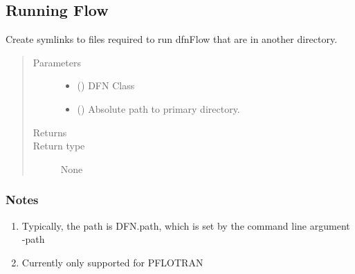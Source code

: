 \documentclass[letterpaper,10pt,english]{sphinxmanual}
\begin{document}
\subsection{Running Flow}
\label{\detokenize{pydfnworks:module-pydfnworks.dfnFlow.flow}}\label{\detokenize{pydfnworks:running-flow}}

\begin{fulllineitems}
\label{\detokenize{pydfnworks:pydfnworks.dfnFlow.flow.create_dfn_flow_links}}
Create symlinks to files required to run dfnFlow that are in another directory.
\begin{quote}\begin{description}
\item[{Parameters}] \leavevmode\begin{itemize}
\item {} 
 () \textendash{} DFN Class

\item {} 
 () \textendash{} Absolute path to primary directory.

\end{itemize}

\item[{Returns}] \leavevmode


\item[{Return type}] \leavevmode
None

\end{description}\end{quote}
\subsubsection*{Notes}
\begin{enumerate}
\def\theenumi{\arabic{enumi}}
\def\labelenumi{\theenumi .}
\makeatletter\def\p@enumii{\p@enumi \theenumi .}\makeatother
\item {} 
Typically, the path is DFN.path, which is set by the command line argument -path

\item {} 
Currently only supported for PFLOTRAN

\end{enumerate}

\end{fulllineitems}
\end{document}
